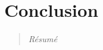 \chapter{Conclusion}
\label{chap:ch8}
\begin{quotation}
\textit{Résumé}
\end{quotation}
\minitoc
\newpage

